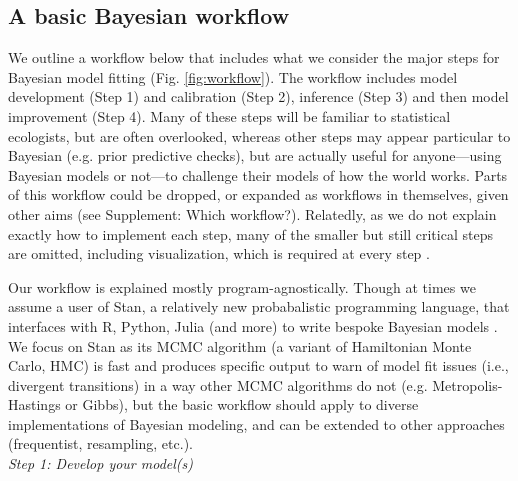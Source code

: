 \documentclass[11pt]{article}
\begin{document}
\subsection*{A basic Bayesian workflow}
We outline a workflow below that includes what we consider the major steps for Bayesian model fitting (Fig. \ref{fig:workflow}). The workflow includes model development (Step 1) and calibration (Step 2), inference (Step 3) and then model improvement (Step 4). Many of these steps will be familiar to statistical ecologists, but are often overlooked, whereas other steps may appear particular to Bayesian (e.g. prior predictive checks), but are actually useful for anyone---using Bayesian models or not---to challenge their models of how the world works. Parts of this workflow could be dropped, or expanded as workflows in themselves, given other aims (see Supplement: Which workflow?). Relatedly, as we do not explain exactly how to implement each step, many of the smaller but still critical steps are omitted, including visualization, which is required at every step \citep[and for which there are many good resources, e.g.][]{gabryvis}. 

Our workflow is explained mostly program-agnostically. Though at times we assume a user of \textsf{Stan}, a relatively new probabalistic programming language, that interfaces with \textsf{R, Python, Julia} (and more) to write bespoke Bayesian models \citep{Carpenter:2017stan}. We focus on \textsf{Stan} as its MCMC algorithm (a variant of Hamiltonian Monte Carlo, HMC) is fast and produces specific output to warn of model fit issues (i.e., divergent transitions) in a way other MCMC algorithms do not (e.g. Metropolis-Hastings or Gibbs), but the basic workflow should apply to diverse implementations of Bayesian modeling, and can be extended to other approaches (frequentist, resampling, etc.). \\ %


\emph{Step 1: Develop your model(s)} 
\end{document}
